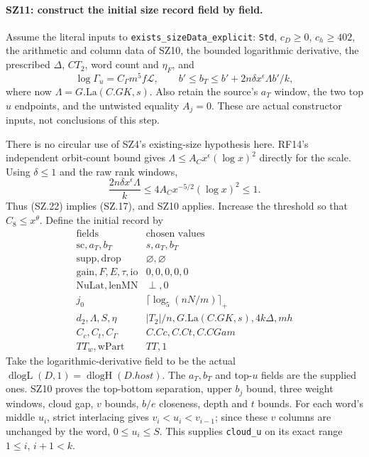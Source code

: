 \paragraph{SZ11: construct the initial size record field by field.}
Assume the literal inputs to \texttt{exists\_sizeData\_explicit}:
\texttt{Std}, $c_D\geq0$, $c_h\geq402$, the arithmetic and
column data of SZ10, the bounded logarithmic derivative, the prescribed
$\Delta$, $CT_2$, word count and $\eta_F$, and
\[
 \log\Gamma_u=C_\Gamma m^5f\mathcal L,
 \qquad
 b'\leq b_T\leq b'+2n\delta x^\epsilon\Lambda b'/k,           \tag{SZ.22}
\]
where now $\Lambda=G.\mathrm{La}(C.GK,s)$. Also retain the source's
$a_T$ window, the two top $u$ endpoints, and the untwisted equality
$A_j=0$. These are actual constructor inputs, not conclusions of
this step.

There is no circular use of SZ4's existing-size hypothesis here.
RF14's independent orbit-count bound gives
$\Lambda\leq A_Cx^\epsilon(\log x)^2$ directly for the scale.
Using $\delta\leq1$ and the raw rank windows,
\[
 \frac{2n\delta x^\epsilon\Lambda}{k}
       \leq4A_C x^{-5/2}(\log x)^2\leq1.                    \tag{SZ.23}
\]
Thus (SZ.22) implies (SZ.17), and SZ10 applies. Increase the
threshold so that $C_8\leq x^\theta$. Define the initial record by
\[
 \begin{array}{c|l}
 \text{fields}&\text{chosen values}\\\hline
 \mathrm{sc},a_T,b_T&s,a_T,b_T\\
 \mathrm{supp},\mathrm{drop}&\varnothing,\varnothing\\
 \mathrm{gain},F,E,\tau,\mathrm{io}&0,0,0,0,0\\
 \mathrm{NuLat},\mathrm{lenMN}&\perp,0\\
 j_0&\lceil\log_5(nN/m)\rceil_+\\
 d_2,\Lambda,S,\eta&|T_2|/n,G.\mathrm{La}(C.GK,s),4k\Delta,mh\\
 C_c,C_t,C_\Gamma&C.Cc,C.Ct,C.CGam\\
 TT_w,\mathrm{wPart}&TT,1
 \end{array}                                                     \tag{SZ.24}
\]
Take the logarithmic-derivative field to be the actual
$\operatorname{dlogL}(D,1)=\operatorname{dlogH}(D.host)$.
The $a_T,b_T$ and top-$u$ fields are the supplied ones. SZ10 proves
the top-bottom separation, upper $b_j$ bound, three weight windows,
cloud gap, $v$ bounds, $b/e$ closeness, depth and $t$ bounds.
For each word's middle $u_i$, strict interlacing gives
$v_i<u_i<v_{i-1}$; since these $v$ columns are unchanged by the
word, $0\leq u_i\leq S$. This supplies \texttt{cloud\_u} on
its exact range $1\leq i$, $i+1<k$.

